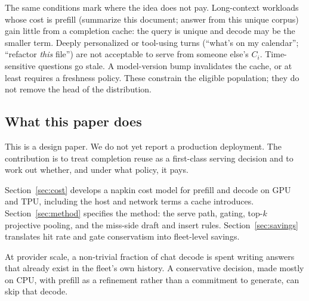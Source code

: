 The same conditions mark where the idea does not pay. Long-context workloads whose cost is prefill (summarize this document; answer from this unique corpus) gain little from a completion cache: the query is unique and decode may be the smaller term. Deeply personalized or tool-using turns (``what's on my calendar''; ``refactor \emph{this} file'') are not acceptable to serve from someone else's $C_i$. Time-sensitive questions go stale. A model-version bump invalidates the cache, or at least requires a freshness policy. These constrain the eligible population; they do not remove the head of the distribution.

\subsection{What this paper does}
\label{sec:intro-contrib}

This is a design paper. We do not yet report a production deployment. The contribution is to treat completion reuse as a first-class serving decision and to work out whether, and under what policy, it pays.

Section~\ref{sec:cost} develops a napkin cost model for prefill and decode on GPU and TPU, including the host and network terms a cache introduces. Section~\ref{sec:method} specifies the method: the serve path, gating, top-$k$ projective pooling, and the miss-side draft and insert rules. Section~\ref{sec:savings} translates hit rate and gate conservatism into fleet-level savings.

At provider scale, a non-trivial fraction of chat decode is spent writing answers that already exist in the fleet's own history. A conservative decision, made mostly on CPU, with prefill as a refinement rather than a commitment to generate, can skip that decode.
